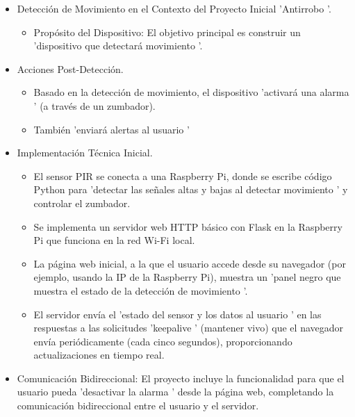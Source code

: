 \documentclass{report}
\begin{document}
\begin{itemize}
    \item Detección de Movimiento en el Contexto del Proyecto Inicial  'Antirrobo '.
    \begin{itemize}
        \item Propósito del Dispositivo: El objetivo principal es construir un  'dispositivo que detectará movimiento '.
    \end{itemize}

    \item Acciones Post-Detección.
    \begin{itemize}
        \item Basado en la detección de movimiento, el dispositivo  'activará una alarma ' (a través de un zumbador).
        \item También  'enviará alertas al usuario '
    \end{itemize}

    \item Implementación Técnica Inicial.
    \begin{itemize}
        \item El sensor PIR se conecta a una Raspberry Pi, donde se escribe código Python para  'detectar las señales altas y bajas al detectar movimiento ' 
        y controlar el zumbador.
        \item Se implementa un servidor web HTTP básico con Flask en la Raspberry Pi que funciona en la red Wi-Fi local.
        \item La página web inicial, a la que el usuario accede desde su navegador (por ejemplo, usando la IP de la Raspberry Pi), muestra un  'panel negro 
        que muestra el estado de la detección de movimiento '.
        \item El servidor envía el  'estado del sensor y los datos al usuario ' en las respuestas a las solicitudes  'keepalive ' (mantener vivo) que el 
        navegador envía periódicamente (cada cinco segundos), proporcionando actualizaciones en tiempo real.
    \end{itemize}

    \item Comunicación Bidireccional: El proyecto incluye la funcionalidad para que el usuario pueda  'desactivar la alarma ' desde la página web, completando 
    la comunicación bidireccional entre el usuario y el servidor.
\end{itemize}
\end{document}
